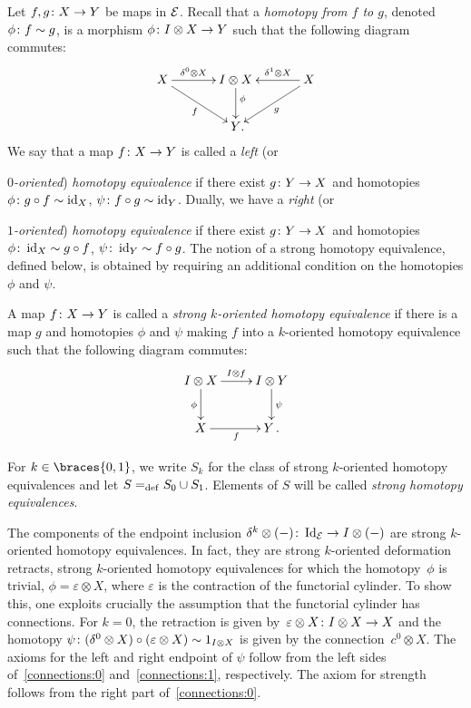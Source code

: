 \documentclass[reqno,10pt,a4paper,oneside,draft]{amsart}
\begin{document}
Let $f, g \colon X \to Y$ be maps in $\mathcal{E}$.
Recall that a \emph{homotopy from $f$ to $g$}, denoted $\phi \colon f \sim g$, is a morphism $\phi \colon I \otimes X \to Y$ such that the following diagram commutes:
\begin{equation} \label{equ:homotopy}
\begin{gathered}
\xymatrix@C=1.2cm{
  X
  \ar[r]^-{\lcyl \otimes X}
  \ar[dr]_{f}
&
  \interval \otimes X
  \ar[d]^(0.4){\phi}
&
  X
  \ar[dl]^{g}
  \ar[l]_-{\rcyl \otimes X}
\\&
  Y
\rlap{.}}
\end{gathered}
\end{equation}
We say that a map $f \colon X \to Y$ is called a \emph{left} (or {\emph{$0$-oriented}) \emph{homotopy equivalence} if there exist $g \colon Y \to X$ and homotopies $\phi \colon g \mathbin{\circ} f \sim \operatorname{id}_X $, $\psi \colon f \mathbin{\circ} g \sim \operatorname{id}_Y$.
Dually, we have a \emph{right} (or {\emph{ $1$-oriented}) \emph{homotopy equivalence} if there exist $g \colon Y \to X$ and homotopies  $\phi \colon \operatorname{id}_X \sim g \mathbin{\circ} f$, $\psi \colon \operatorname{id}_Y \sim f \mathbin{\circ} g$.  The notion of a strong
homotopy equivalence, defined below, is obtained by requiring an additional condition on the homotopies $\phi$ and $\psi$. 



\begin{definition} \label{def:strhe}
A map $f \colon X \to Y$ is called a \emph{strong $k$-oriented homotopy equivalence} if there is a map $g$ and homotopies $\phi$ and $\psi$ making $f$ into a
$k$-oriented homotopy equivalence such that the following diagram commutes:
\[
\xymatrix{
  \interval \otimes X
  \ar[r]^{\interval \otimes f}
  \ar[d]_{\phi}
&
  \interval \otimes Y
  \ar[d]^{\psi}
\\
  X
  \ar[r]_{f}
&
  Y \, . 
}
\]
\end{definition}

For $k \in \braces{0, 1}$, we write $S_k$ for the class of strong $k$-oriented homotopy equivalences and let $S =_{\operatorname{def}} S_0 \cup S_1$.
Elements of $S$ will be called \emph{strong homotopy equivalences}. 

\begin{remark}  The components of the endpoint 
inclusion $\delta^k \otimes (-) \colon \operatorname{Id}_{\mathcal{E}} \to I \otimes (-)$
are strong $k$-oriented homotopy equivalences. In fact, they are 
strong $k$-oriented deformation retracts, \ie strong $k$-oriented homotopy equivalences for which 
the homotopy~$\phi$ is trivial, \ie  $\phi = \varepsilon \otimes X$, where $\varepsilon$ is the contraction of the functorial cylinder. 
To show this, one exploits crucially the assumption that the functorial cylinder has
connections. For $k = 0$, the retraction is given by~$\varepsilon \otimes X \colon I \otimes X \to X$ and the homotopy 
$\psi \colon (\delta^0 \otimes X) \circ (\varepsilon \otimes X)  \sim 
1_{I \otimes X}$ is given by the connection~$c^0 \otimes X$. 
The axioms for the left and right endpoint of $\psi$ follow from the left sides of~\eqref{connections:0} and~\eqref{connections:1}, respectively.
The axiom for strength follows from the right part of~\eqref{connections:0}. 
\end{remark}




}}
\end{document}
